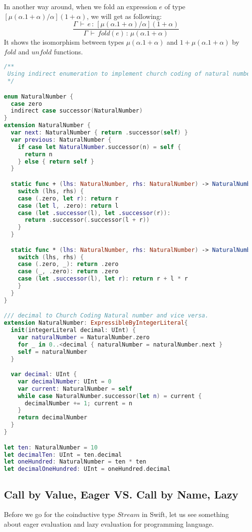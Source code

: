 \documentclass{article}
\begin{document}
In another way around, when we fold an expression $e$ of type $[\mu(\alpha.1+\alpha)/\alpha](1+\alpha)$, we will get as following:
\begin{equation*}
\frac{\Gamma\,\vdash\,e\,:\,[\mu(\alpha.1+\alpha)/\alpha](1+\alpha)}{\Gamma\,\vdash\,fold(e)\,:\,\mu(\alpha.1+\alpha)}
\end{equation*}
It shows the isomorphism between types $\mu(\alpha.1+\alpha)$ and $1+\mu(\alpha.1+\alpha)$ by $fold$ and $unfold$ functions.

\begin{lstlisting}[language=Swift]
/**
 Using indirect enumeration to implement church coding of natural number
 */

enum NaturalNumber {
  case zero
  indirect case successor(NaturalNumber)
}
extension NaturalNumber {
  var next: NaturalNumber { return .successor(self) }
  var previous: NaturalNumber {
    if case let NaturalNumber.successor(n) = self {
      return n
    } else { return self }
  }

  static func + (lhs: NaturalNumber, rhs: NaturalNumber) -> NaturalNumber {
    switch (lhs, rhs) {
    case (.zero, let r): return r
    case (let l, .zero): return l
    case (let .successor(l), let .successor(r)):
      return .successor(.successor(l + r))
    }
  }

  static func * (lhs: NaturalNumber, rhs: NaturalNumber) -> NaturalNumber {
    switch (lhs, rhs) {
    case (.zero, _): return .zero
    case (_, .zero): return .zero
    case (let .successor(l), let r): return r + l * r
    }
  }
}

/// decimal to Church Coding Natural number and vice versa.
extension NaturalNumber: ExpressibleByIntegerLiteral{
  init(integerLiteral decimal: UInt) {
    var naturalNumber = NaturalNumber.zero
    for _ in 0..<decimal { naturalNumber = naturalNumber.next }
    self = naturalNumber
  }

  var decimal: UInt {
    var decimalNumber: UInt = 0
    var current: NaturalNumber = self
    while case NaturalNumber.successor(let n) = current {
      decimalNumber += 1; current = n
    }
    return decimalNumber
  }
}

let ten: NaturalNumber = 10
let decimalTen: UInt = ten.decimal
let oneHundred: NaturalNumber = ten * ten
let decimalOneHundred: UInt = oneHundred.decimal
\end{lstlisting}

\subsection*{Call by Value, Eager VS. Call by Name, Lazy}
Before we go for the coinductive type $Stream$ in Swift, let us see something about eager evaluation and lazy evaluation for programming language.
\end{document}
